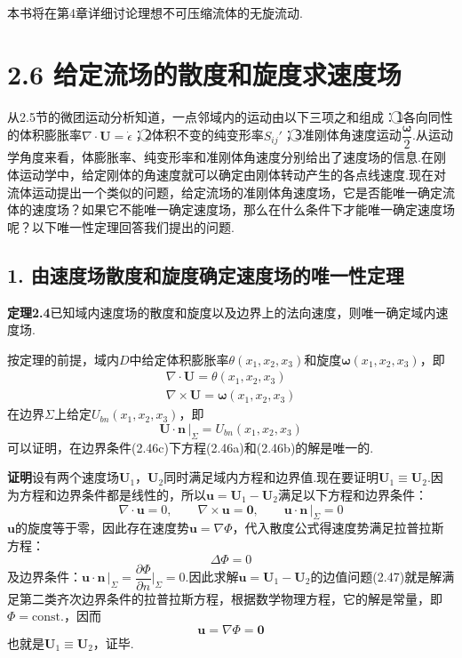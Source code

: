 本书将在第4章详细讨论理想不可压缩流体的无旋流动.
\section*{2.6  给定流场的散度和旋度求速度场}

从2.5节的微团运动分析知道，一点邻域内的运动由以下三项之和组成：\textcircled{1}各向同性的体积膨胀率$\nabla\cdot\boldsymbol{U}=\dot{\epsilon}$；\textcircled{2}体积不变的纯变形率$S_{ij}'$；\textcircled{3}准刚体角速度运动$\dfrac{\boldsymbol{\omega}}{2}$.从运动学角度来看，体膨胀率、纯变形率和准刚体角速度分别给出了速度场的信息.在刚体运动学中，给定刚体的角速度就可以确定由刚体转动产生的各点线速度.现在对流体运动提出一个类似的问题，给定流场的准刚体角速度场，它是否能唯一确定流体的速度场？如果它不能唯一确定速度场，那么在什么条件下才能唯一确定速度场呢？以下唯一性定理回答我们提出的问题.

\subsection*{1. 由速度场散度和旋度确定速度场的唯一性定理}

\noindent\textbf{定理2.4}\quad 已知域内速度场的散度和旋度以及边界上的法向速度，则唯一确定域内速度场.

按定理的前提，域内$D$中给定体积膨胀率$\theta(x_1,x_2,x_3)$和旋度$\boldsymbol{\omega}(x_1,x_2,x_3)$，即
\begin{gather*}
\nabla\cdot\boldsymbol{U}=\theta(x_1,x_2,x_3)\tag{2.46a}\\[2pt]
\nabla\times\boldsymbol{U}=\boldsymbol{\omega}(x_1,x_2,x_3)\tag{2.46b}
\end{gather*}
在边界$\Sigma$上给定$U_{bn}(x_1,x_2,x_3)$，即
\begin{equation*}
\boldsymbol{U}\cdot\boldsymbol{n}\,\big|_{\Sigma}=U_{bn}(x_1,x_2,x_3)
\tag{2.46c}
\end{equation*}
可以证明，在边界条件(2.46c)下方程(2.46a)和(2.46b)的解是唯一的.

\noindent\textbf{证明}\quad 设有两个速度场$\boldsymbol{U}_1$，$\boldsymbol{U}_2$同时满足域内方程和边界值.现在要证明$\boldsymbol{U}_1\equiv\boldsymbol{U}_2$.因为方程和边界条件都是线性的，所以$\boldsymbol{u}=\boldsymbol{U}_1-\boldsymbol{U}_2$满足以下方程和边界条件：
\begin{equation*}
\nabla\cdot\boldsymbol{u}=0,\qquad \nabla\times\boldsymbol{u}=\boldsymbol{0},\qquad \boldsymbol{u}\cdot\boldsymbol{n}\,\big|_{\Sigma}=0
\tag{2.47}
\end{equation*}
$\boldsymbol{u}$的旋度等于零，因此存在速度势$\boldsymbol{u}=\nabla\Phi$，代入散度公式得速度势满足拉普拉斯方程：
\[
\Delta\Phi=0
\]
及边界条件：$\boldsymbol{u}\cdot\boldsymbol{n}\,\big|_{\Sigma}=\dfrac{\partial\Phi}{\partial n}\Big|_{\Sigma}=0$.因此求解$\boldsymbol{u}=\boldsymbol{U}_1-\boldsymbol{U}_2$的边值问题(2.47)就是解满足第二类齐次边界条件的拉普拉斯方程，根据数学物理方程，它的解是常量，即$\Phi=\mathrm{const.}$，因而
\[
\boldsymbol{u}=\nabla\Phi=\boldsymbol{0}
\]
也就是$\boldsymbol{U}_1\equiv\boldsymbol{U}_2$，证毕.

